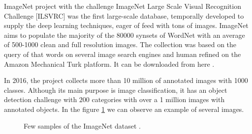 ImageNet project \cite{imagenet} with the challenge ImageNet Large Scale Visual Recognition Challenge [ILSVRC] was the first large-scale database, temporally developed to supply the deep learning techniques, eager of feed with tons of images. ImageNet aims to populate the majority of the 80000 synsets of WordNet with an average of 500-1000 clean and full resolution images. The collection was based on the query of that words on several image search engines and human refined on the Amazon Mechanical Turk platform. It can be downloaded from here \cite{imagenetWebsite}.

In 2016, the project collects more than 10 million of annotated images with 1000 classes. Although its main purpose is image classification, it has an object detection challenge with $200$ categories with over a 1 million images with annotated objects. In the figure \ref{imagenetdata22} we can observe an example of several images.

\begin{figure}[H]
		
\centering
{}
\caption{Few samples of the ImageNet dataset .} \label{imagenetdata22}

\end{figure}

